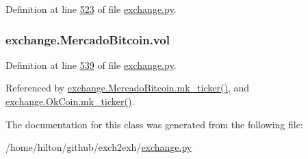 Definition at line \hyperlink{exchange_8py_source_l00523}{523} of file \hyperlink{exchange_8py_source}{exchange.\+py}.

\subsubsection[{\texorpdfstring{vol}{vol}}]{\setlength{\rightskip}{0pt plus 5cm}exchange.\+Mercado\+Bitcoin.\+vol}\hypertarget{classexchange_1_1_mercado_bitcoin_a1c163489086ba85b960db821117cd433}{}\label{classexchange_1_1_mercado_bitcoin_a1c163489086ba85b960db821117cd433}


Definition at line \hyperlink{exchange_8py_source_l00539}{539} of file \hyperlink{exchange_8py_source}{exchange.\+py}.



Referenced by \hyperlink{exchange_8py_source_l00557}{exchange.\+Mercado\+Bitcoin.\+mk\+\_\+ticker()}, and \hyperlink{exchange_8py_source_l00622}{exchange.\+Ok\+Coin.\+mk\+\_\+ticker()}.



The documentation for this class was generated from the following file\+:\begin{DoxyCompactItemize}
\item 
/home/hilton/github/exch2exh/\hyperlink{exchange_8py}{exchange.\+py}\end{DoxyCompactItemize}

